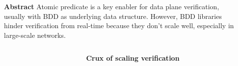 \documentclass[final]{beamer}
\newlength{\sepwidthB}
\newlength{\colwidthB}
\newcommand{\separatorcolumnB}{\begin{column}{\sepwidthB}\end{column}}
\begin{document}
\begin{frame}[t]
\begin{columns}[t]
  \begin{column}{0.49\paperwidth}
    \begin{block}{\Large{\textbf{Abstract}}}
      \large
      Atomic predicate is a key enabler for data plane verification, usually with
      BDD as underlying data structure. However, BDD libraries hinder verification
      from real-time because they don't scale well, especially in large-scale networks.

    \end{block}
  \end{column}
  \begin{column}{0.39\paperwidth}


  \end{column}
\end{columns}

\begin{columns}
\separatorcolumnB
  \begin{column}[T]{\colwidthB}
    \begin{block}{\Large{\textbf{Crux of scaling verification}}}
    \vspace{0.5cm}
    \large


\end{block}
\end{column}
\end{columns}
\end{frame}
\end{document}
